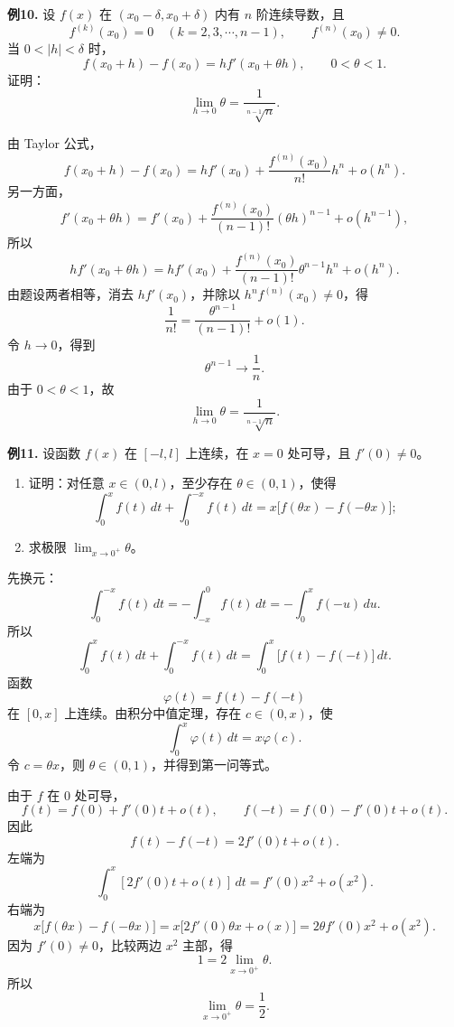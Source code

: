 \begin{problemblock}
\textbf{例10.} 设 \(f(x)\) 在 \((x_0-\delta,x_0+\delta)\) 内有 \(n\) 阶连续导数，且
\[
f^{(k)}(x_0)=0\quad(k=2,3,\cdots,n-1),\qquad f^{(n)}(x_0)\ne0.
\]
当 \(0<|h|<\delta\) 时，
\[
f(x_0+h)-f(x_0)=h f'(x_0+\theta h),\qquad 0<\theta<1.
\]
证明：
\[
\lim_{h\to0}\theta=\frac1{\sqrt[n-1]{n}}.
\]
\end{problemblock}
\begin{solutionblock}
由 Taylor 公式，
\[
f(x_0+h)-f(x_0)
=h f'(x_0)+\frac{f^{(n)}(x_0)}{n!}h^n+o(h^n).
\]
另一方面，
\[
f'(x_0+\theta h)
=f'(x_0)+\frac{f^{(n)}(x_0)}{(n-1)!}(\theta h)^{n-1}
+o(h^{n-1}),
\]
所以
\[
h f'(x_0+\theta h)
=h f'(x_0)+\frac{f^{(n)}(x_0)}{(n-1)!}\theta^{n-1}h^n
+o(h^n).
\]
由题设两者相等，消去 \(h f'(x_0)\)，并除以 \(h^n f^{(n)}(x_0)\ne0\)，得
\[
\frac1{n!}
=\frac{\theta^{n-1}}{(n-1)!}+o(1).
\]
令 \(h\to0\)，得到
\[
\theta^{n-1}\to\frac1n.
\]
由于 \(0<\theta<1\)，故
\[
\lim_{h\to0}\theta=\frac1{\sqrt[n-1]{n}}.
\]
\end{solutionblock}

\begin{problemblock}
\textbf{例11.} 设函数 \(f(x)\) 在 \([-l,l]\) 上连续，在 \(x=0\) 处可导，且 \(f'(0)\ne0\)。
\begin{enumerate}[label=(\arabic*), leftmargin=2.2em]
\item 证明：对任意 \(x\in(0,l)\)，至少存在 \(\theta\in(0,1)\)，使得
\[
\int_0^x f(t)\,dt+\int_0^{-x} f(t)\,dt
=x\bigl[f(\theta x)-f(-\theta x)\bigr];
\]
\item 求极限 \(\displaystyle\lim_{x\to0^+}\theta\)。
\end{enumerate}
\end{problemblock}
\begin{solutionblock}
先换元：
\[
\int_0^{-x} f(t)\,dt=-\int_{-x}^0 f(t)\,dt
=-\int_0^x f(-u)\,du.
\]
所以
\[
\int_0^x f(t)\,dt+\int_0^{-x} f(t)\,dt
=\int_0^x\bigl[f(t)-f(-t)\bigr]\,dt.
\]
函数
\[
\varphi(t)=f(t)-f(-t)
\]
在 \([0,x]\) 上连续。由积分中值定理，存在 \(c\in(0,x)\)，使
\[
\int_0^x\varphi(t)\,dt=x\varphi(c).
\]
令 \(c=\theta x\)，则 \(\theta\in(0,1)\)，并得到第一问等式。

由于 \(f\) 在 \(0\) 处可导，
\[
f(t)=f(0)+f'(0)t+o(t),
\qquad
f(-t)=f(0)-f'(0)t+o(t).
\]
因此
\[
f(t)-f(-t)=2f'(0)t+o(t).
\]
左端为
\[
\int_0^x[2f'(0)t+o(t)]\,dt
=f'(0)x^2+o(x^2).
\]
右端为
\[
x\bigl[f(\theta x)-f(-\theta x)\bigr]
=x\bigl[2f'(0)\theta x+o(x)\bigr]
=2\theta f'(0)x^2+o(x^2).
\]
因为 \(f'(0)\ne0\)，比较两边 \(x^2\) 主部，得
\[
1=2\lim_{x\to0^+}\theta.
\]
所以
\[
\lim_{x\to0^+}\theta=\frac12.
\]
\end{solutionblock}

